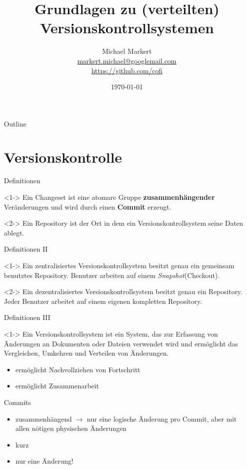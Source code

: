 \documentclass[presentation]{beamer}
\title{Grundlagen zu (verteilten) Versionskontrollsystemen}
\author[Michael Markert]{Michael Markert\\
  \href{mailto:markert.michael@googlemail.com}{markert.michael@googlemail.com}\\
  \url{https://github.com/cofi}}
\date{\today}
\begin{document}
\begin{frame}[plain]
  \titlepage
\end{frame}

\begin{frame}{Outline}
  \setcounter{tocdepth}{1}
  \tableofcontents
\end{frame}
\section{Versionskontrolle}
\begin{frame}{Definitionen}
  \begin{definition}<1->
    Ein \alert{Changeset} ist eine atomare Gruppe \textbf{zusammenhängender}
    Veränderungen und wird durch einen \textbf{Commit} erzeugt.
  \end{definition}
  \begin{definition}<2->
    Ein \alert{Repository} ist der Ort in dem ein Versionskontrollsystem seine
    Daten ablegt.
  \end{definition}
\end{frame}
\begin{frame}{Definitionen II}
  \begin{definition}<1->
    Ein \alert{zentralisiertes Versionskontrollsystem} besitzt genau ein
    gemeinsam benutztes Repository. Benutzer arbeiten auf einem
    \emph{Snapshot}(Checkout).
  \end{definition}
  \begin{definition}<2->
    Ein \alert{dezentralisiertes Versionskontrollsystem} besitzt genau ein
    Repository. Jeder Benutzer arbeitet auf einem eigenen kompletten Repository.
  \end{definition}
\end{frame}
\begin{frame}{Definitionen III}
  \begin{definition}<1->
    Ein \alert{Versionskontrollsystem} ist ein System, das zur Erfassung von
    Änderungen an Dokumenten oder Dateien verwendet wird und ermöglicht das
    Vergleichen, Umkehren und Verteilen von Änderungen.
  \end{definition}
  \begin{itemize}
  \item<2-> ermöglicht Nachvollziehen von Fortschritt
  \item<3-> ermöglicht Zusammenarbeit
  \end{itemize}
\end{frame}
\begin{frame}{Commits}
  \begin{itemize}[<+->]
  \item zusammenhängend $\rightarrow$ nur eine logische Änderung pro Commit,
    aber mit allen nötigen physischen Änderungen
  \item kurz
  \item nur eine Änderung!
  \end{itemize}
\end{frame}
\end{document}

